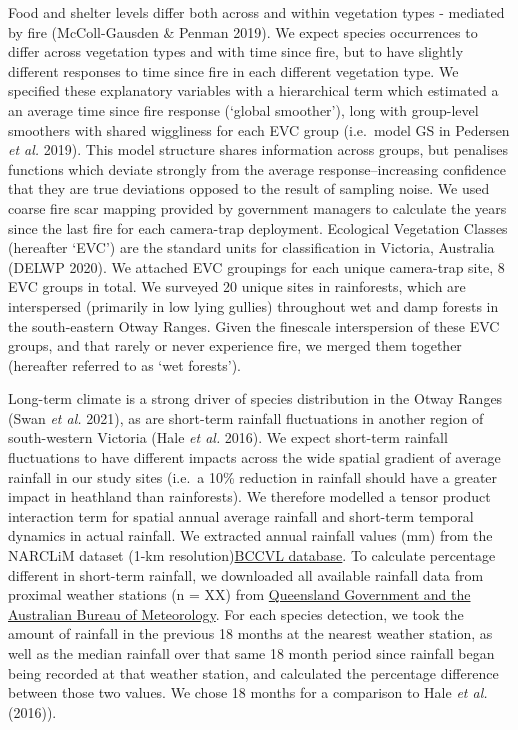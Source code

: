 \documentclass[11pt,a4paper,titlepage,twoside,openright]{style/unimelbthesis}
\begin{document}
\begin{mainmatter}
Food and shelter levels differ both across and within vegetation types - mediated by fire (McColl-Gausden \& Penman 2019). We expect species occurrences to differ across vegetation types and with time since fire, but to have slightly different responses to time since fire in each different vegetation type. We specified these explanatory variables with a hierarchical term which estimated a an average time since fire response (`global smoother'), long with group-level smoothers with shared wiggliness for each EVC group (i.e.~model GS in Pedersen \emph{et al.} 2019). This model structure shares information across groups, but penalises functions which deviate strongly from the average response--increasing confidence that they are true deviations opposed to the result of sampling noise. We used coarse fire scar mapping provided by government managers to calculate the years since the last fire for each camera-trap deployment. Ecological Vegetation Classes (hereafter `EVC') are the standard units for classification in Victoria, Australia (DELWP 2020). We attached EVC groupings for each unique camera-trap site, 8 EVC groups in total. We surveyed 20 unique sites in rainforests, which are interspersed (primarily in low lying gullies) throughout wet and damp forests in the south-eastern Otway Ranges. Given the finescale interspersion of these EVC groups, and that rarely or never experience fire, we merged them together (hereafter referred to as `wet forests').

Long-term climate is a strong driver of species distribution in the Otway Ranges (Swan \emph{et al.} 2021), as are short-term rainfall fluctuations in another region of south-western Victoria (Hale \emph{et al.} 2016). We expect short-term rainfall fluctuations to have different impacts across the wide spatial gradient of average rainfall in our study sites (i.e.~a 10\% reduction in rainfall should have a greater impact in heathland than rainforests). We therefore modelled a tensor product interaction term for spatial annual average rainfall and short-term temporal dynamics in actual rainfall. We extracted annual rainfall values (mm) from the NARCLiM dataset (1-km resolution)\href{\%22https://app.bccvl.org.au/datasets?iframe\#c12=modified\&reversed=on\&b_start=0\&c2=4816d016b9af4fb18f6cc8b2f1f979dc\%22}{BCCVL database}. To calculate percentage different in short-term rainfall, we downloaded all available rainfall data from proximal weather stations (n = XX) from \href{\%22https://www.longpaddock.qld.gov.au/silo/point-data/\%22}{Queensland Government and the Australian Bureau of Meteorology}. For each species detection, we took the amount of rainfall in the previous 18 months at the nearest weather station, as well as the median rainfall over that same 18 month period since rainfall began being recorded at that weather station, and calculated the percentage difference between those two values. We chose 18 months for a comparison to Hale \emph{et al.} (2016)).


\end{mainmatter}
\end{document}
